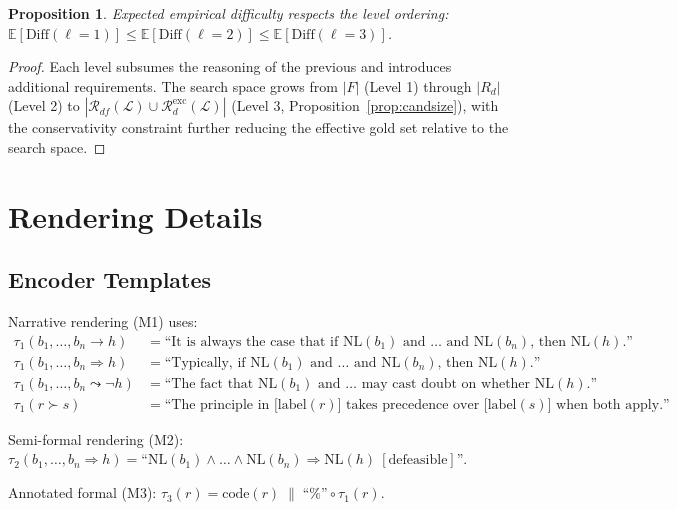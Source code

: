 \documentclass{article}
\newtheorem{proposition}[theorem]{Proposition}
\theoremstyle{definition}
\newcommand{\La}{\mathcal{L}}
\newcommand{\Rd}{R_d}
\newcommand{\Rdfspace}{\mathcal{R}_{df}}
\newcommand{\Rdexcspace}{\mathcal{R}_{d}^{\mathrm{exc}}}
\newcommand{\NL}{\mathrm{NL}}
\newcommand{\Diff}{\mathrm{Diff}}
\newcommand{\defto}{\Rightarrow}
\newcommand{\strictto}{\rightarrow}
\newcommand{\defeatto}{\leadsto}
\begin{document}
\begin{proposition}\label{prop:difforder}
Expected empirical difficulty respects the level ordering: $\mathbb{E}[\Diff(\ell{=}1)] \leq \mathbb{E}[\Diff(\ell{=}2)] \leq \mathbb{E}[\Diff(\ell{=}3)]$.
\end{proposition}

\begin{proof}
Each level subsumes the reasoning of the previous and introduces additional requirements. The search space grows from $|F|$ (Level 1) through $|\Rd|$ (Level 2) to $|\Rdfspace(\La) \cup \Rdexcspace(\La)|$ (Level 3, Proposition~\ref{prop:candsize}), with the conservativity constraint further reducing the effective gold set relative to the search space.
\end{proof}


\section{Rendering Details}\label{app:rendering}

\subsection{Encoder Templates}

Narrative rendering (M1) uses:
\begin{align*}
    \tau_1(b_1, \ldots, b_n \strictto h) &= \text{``It is always the case that if } \NL(b_1) \text{ and \ldots\ and } \NL(b_n)\text{, then } \NL(h)\text{.''} \\
    \tau_1(b_1, \ldots, b_n \defto h) &= \text{``Typically, if } \NL(b_1) \text{ and \ldots\ and } \NL(b_n)\text{, then } \NL(h)\text{.''} \\
    \tau_1(b_1, \ldots, b_n \defeatto \neg h) &= \text{``The fact that } \NL(b_1) \text{ and \ldots\ may cast doubt on whether } \NL(h)\text{.''} \\
    \tau_1(r \succ s) &= \text{``The principle in [}\mathrm{label}(r)\text{] takes precedence over [}\mathrm{label}(s)\text{] when both apply.''}
\end{align*}

Semi-formal rendering (M2): $\tau_2(b_1, \ldots, b_n \defto h) = \text{``}\NL(b_1) \wedge \ldots \wedge \NL(b_n) \Rightarrow \NL(h)\ [\text{defeasible}]\text{''}$.

Annotated formal (M3): $\tau_3(r) = \mathrm{code}(r) \;\|\; \text{``\% ''} \circ \tau_1(r)$.
\end{document}
